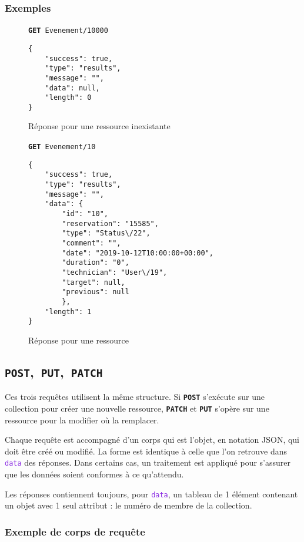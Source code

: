 \documentclass[a4paper,twoside]{article}
\newcommand{\verbe}[1]{\texttt{\textbf{#1}}}
\newcommand{\adresse}[1]{\texttt{#1}}
\newcommand{\requete}[2]{\verbe{#1}~\adresse{#2}}
\newcommand{\attribut}[1]{\textcolor{BlueViolet}{\texttt{#1}}}
\begin{document}
\subsubsection{Exemples}

\begin{figure*}
  \caption{Réponse pour une ressource inexistante}
  \label{fig:reponseRessourceInexistante}
  \requete{GET}{Evenement/10000}
  \begin{verbatim}
{
	"success": true,
	"type": "results",
	"message": "",
	"data": null,
	"length": 0
}
  \end{verbatim}
\end{figure*}


\begin{figure*}
  \caption{Réponse pour une ressource}
  \label{fig:reponseRessource}
  \requete{GET}{Evenement/10}
  \begin{verbatim}
{
	"success": true,
	"type": "results",
	"message": "",
	"data": {
		"id": "10",
		"reservation": "15585",
		"type": "Status\/22",
		"comment": "",
		"date": "2019-10-12T10:00:00+00:00",
		"duration": "0",
		"technician": "User\/19",
		"target": null,
		"previous": null
		},
	"length": 1
}
  \end{verbatim}
\end{figure*}

\subsection{\verbe{POST},~\verbe{PUT},~\verbe{PATCH}}

Ces trois requêtes utilisent la même structure. Si \verbe{POST} s'exécute sur une collection pour créer une nouvelle ressource, \verbe{PATCH} et \verbe{PUT} s'opère sur une ressource pour la modifier où la remplacer.

Chaque requête est accompagné d'un corps qui est l'objet, en notation JSON, qui doit être créé ou modifié. La forme est identique à celle que l'on retrouve dans \attribut{data} des réponses. Dans certains cas, un traitement est appliqué pour s'assurer que les données soient conformes à ce qu'attendu.

Les réponses contiennent toujours, pour \attribut{data}, un tableau de 1 élément contenant un objet avec 1 seul attribut : le numéro de membre de la collection.

\subsubsection{Exemple de corps de requête}
\end{document}
